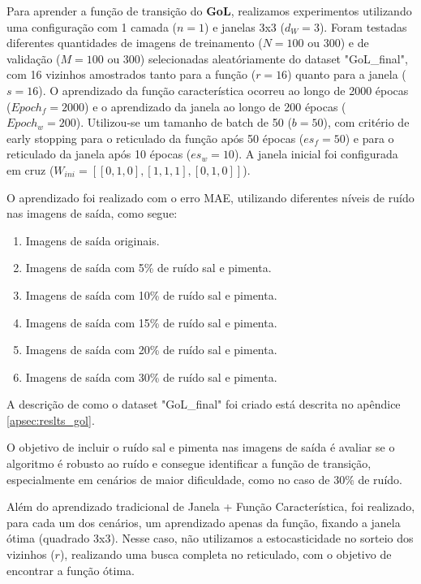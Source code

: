 Para aprender a função de transição do \textbf{GoL}, realizamos experimentos utilizando uma configuração com 1 camada ($n=1$) e janelas 3x3 ($d_{W} = 3$). Foram testadas diferentes quantidades de imagens de treinamento ($N = 100 \text{ ou } 300$) e de validação ($M = 100 \text{ ou } 300$) selecionadas aleatóriamente do dataset "GoL\_final", com 16 vizinhos amostrados tanto para a função ($r=16$) quanto para a janela ($s=16$). O aprendizado da função característica ocorreu ao longo de 2000 épocas ($Epoch_f = 2000$) e o aprendizado da janela ao longo de 200 épocas ($Epoch_w = 200$). Utilizou-se um tamanho de batch de 50 ($b=50$), com critério de early stopping para o reticulado da função após 50 épocas ($es_{f} = 50$) e para o reticulado da janela após 10 épocas ($es_{w} = 10$). A janela inicial foi configurada em cruz ($W_{ini} = [[0,1,0],[1,1,1],[0,1,0]]$).

O aprendizado foi realizado com o erro MAE, utilizando diferentes níveis de ruído nas imagens de saída, como segue:

\begin{enumerate}
    \item Imagens de saída originais.
    \item Imagens de saída com 5\% de ruído sal e pimenta.
    \item Imagens de saída com 10\% de ruído sal e pimenta.
    \item Imagens de saída com 15\% de ruído sal e pimenta.
    \item Imagens de saída com 20\% de ruído sal e pimenta.
    \item Imagens de saída com 30\% de ruído sal e pimenta.
\end{enumerate}

A descrição de como o dataset "GoL\_final" foi criado está descrita no apêndice \ref{apsec:reslts_gol}.

O objetivo de incluir o ruído sal e pimenta nas imagens de saída é avaliar se o algoritmo é robusto ao ruído e consegue identificar a função de transição, especialmente em cenários de maior dificuldade, como no caso de 30\% de ruído.

Além do aprendizado tradicional de Janela + Função Característica, foi realizado, para cada um dos cenários, um aprendizado apenas da função, fixando a janela ótima (quadrado 3x3). Nesse caso, não utilizamos a estocasticidade no sorteio dos vizinhos ($r$), realizando uma busca completa no reticulado, com o objetivo de encontrar a função ótima.

